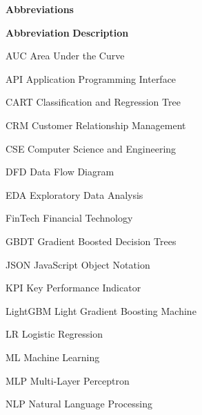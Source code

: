 

\begin{center}
\textbf{\large{Abbreviations}}
\end{center}
\vspace{1cm}
\begin{abbrv}

\item[\textbf{Abbreviation}] \hspace{2.25cm}\textbf{Description}
\item[AUC]   \hspace{2cm} Area Under the Curve
\item[API]   \hspace{2cm} Application Programming Interface
\item[CART]  \hspace{2cm} Classification and Regression Tree
\item[CRM]   \hspace{2cm} Customer Relationship Management
\item[CSE]   \hspace{2cm} Computer Science and Engineering
\item[DFD]   \hspace{2cm} Data Flow Diagram
\item[EDA]   \hspace{2cm} Exploratory Data Analysis
\item[FinTech] \hspace{2cm} Financial Technology
\item[GBDT]  \hspace{2cm} Gradient Boosted Decision Trees
\item[JSON]  \hspace{2cm} JavaScript Object Notation
\item[KPI]   \hspace{2cm} Key Performance Indicator
\item[LightGBM] \hspace{2cm} Light Gradient Boosting Machine
\item[LR]    \hspace{2cm} Logistic Regression
\item[ML]    \hspace{2cm} Machine Learning
\item[MLP]   \hspace{2cm} Multi-Layer Perceptron
\item[NLP]   \hspace{2cm} Natural Language Processing

\end{abbrv}

